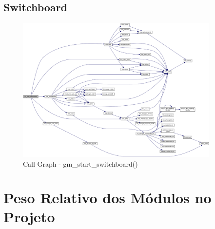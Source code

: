 \documentclass{report}
\begin{document}
\subsection{Switchboard}

\begin{figure}[H]
	\centering
	\includegraphics[width=0.9\textwidth]{gm_start_switchboard}
	\caption{Call Graph - gm\_start\_switchboard()}
\end{figure}

\section{Peso Relativo dos Módulos no Projeto}
\end{document}
